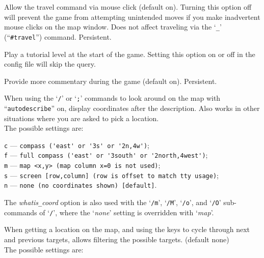 Allow the travel command via mouse click (default on).
Turning this option off will prevent the game from attempting unintended
moves if you make inadvertent mouse clicks on the map window.
Does not affect traveling via the `{\tt \verb+_+}' (``{\tt \#travel}'')
command.  Persistent.
\item[\ib{tutorial}]
Play a tutorial level at the start of the game.
Setting this option on or off in the config file will skip the query.
\item[\ib{verbose}]
Provide more commentary during the game (default on).  Persistent.
\item[\ib{whatis\verb+_+coord}]
When using the `{\tt /}' or `{\tt ;}' commands to look around on the map with
``{\tt autodescribe}''
on, display coordinates after the description.
Also works in other situations where you are asked to pick a location.\\

The possible settings are:

{\tt c} --- \verb#compass ('east' or '3s' or '2n,4w')#;\\
{\tt f} --- \verb#full compass ('east' or '3south' or '2north,4west')#;\\
{\tt m} --- \verb#map <x,y> (map column x=0 is not used)#;\\
{\tt s} --- \verb#screen [row,column] (row is offset to match tty usage)#;\\
{\tt n} --- \verb#none (no coordinates shown) [default]#.

The
{\it whatis\verb+_+coord\/}
option is also used with
the `{\tt /m}', `{\tt /M}', `{\tt /o}', and `{\tt /O}' sub-commands
of `{\tt /}',
where the `{\it none\/}' setting is overridden with `{\it map}'.
\item[\ib{whatis\verb+_+filter}]
When getting a location on the map, and using the keys to cycle through
next and previous targets, allows filtering the possible targets.
(default none)\\
The possible settings are:

